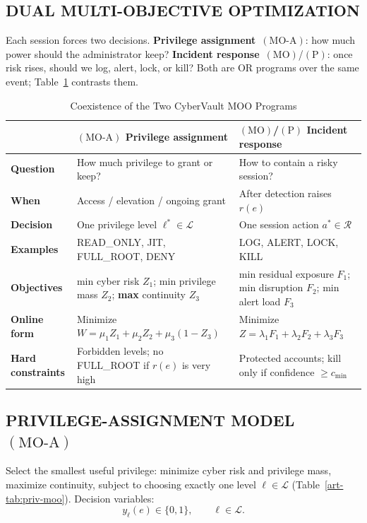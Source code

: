\subsection{DUAL MULTI-OBJECTIVE OPTIMIZATION}
Each session forces two decisions. \textbf{Privilege assignment}~$(\mathrm{MO}\text{-}\mathrm{A})$: how much power should the administrator keep? \textbf{Incident response}~$(\mathrm{MO})$/$(\mathrm{P})$: once risk rises, should we log, alert, lock, or kill? Both are OR programs over the same event; Table~\ref{art-tab:moo-coexist} contrasts them.

\begin{table}[H]
\caption{Coexistence of the Two CyberVault MOO Programs}
\label{art-tab:moo-coexist}
\centering
\scriptsize
\begin{tabular}{@{}p{} p{} p{}@{}}
\toprule
 & \textbf{$(\mathrm{MO}\text{-}\mathrm{A})$ Privilege assignment} & \textbf{$(\mathrm{MO})$/$(\mathrm{P})$ Incident response} \\
\midrule
\textbf{Question} & How much privilege to grant or keep? & How to contain a risky session? \\
\textbf{When} & Access / elevation / ongoing grant & After detection raises $r(e)$ \\
\textbf{Decision} & One privilege level $\ell^*\in\mathcal{L}$ & One session action $a^*\in\mathcal{R}$ \\
\textbf{Examples} & READ\_ONLY, JIT, FULL\_ROOT, DENY & LOG, ALERT, LOCK, KILL \\
\textbf{Objectives} & min cyber risk $Z_1$; min privilege mass $Z_2$; \textbf{max} continuity $Z_3$ & min residual exposure $F_1$; min disruption $F_2$; min alert load $F_3$ \\
\textbf{Online form} & Minimize $W=\mu_1 Z_1+\mu_2 Z_2+\mu_3(1-Z_3)$ & Minimize $Z=\lambda_1 F_1+\lambda_2 F_2+\lambda_3 F_3$ \\
\textbf{Hard constraints} & Forbidden levels; no FULL\_ROOT if $r(e)$ is very high & Protected accounts; kill only if confidence $\geq c_{\min}$ \\
\bottomrule
\end{tabular}
\end{table}


\subsection{PRIVILEGE-ASSIGNMENT MODEL $(\mathrm{MO}\text{-}\mathrm{A})$}
Select the smallest useful privilege: minimize cyber risk and privilege mass, maximize continuity, subject to choosing exactly one level $\ell\in\mathcal{L}$ (Table~\ref{art-tab:priv-moo}). Decision variables:
\begin{equation}
y_{\ell}(e)\in\{0,1\}, \qquad \ell\in\mathcal{L}.
\tag{4.5}
\end{equation}

